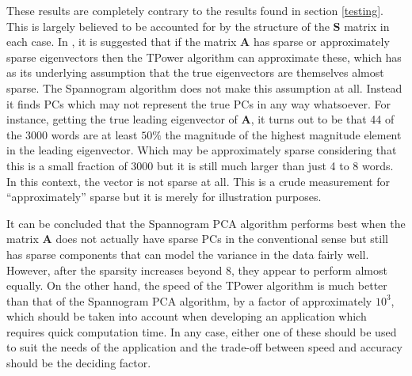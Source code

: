 \documentclass[11pt,a4paper]{article}
\begin{document}
These results are completely contrary to the results found in section \ref{testing}. This is largely believed to be accounted for by the structure of the $\mathbf{S}$ matrix in each case. In \cite{truncpower}, it is suggested that if the matrix $\mathbf{A}$ has sparse or approximately sparse eigenvectors then the TPower algorithm can approximate these, which has as its underlying assumption that the true eigenvectors are themselves almost sparse. The Spannogram algorithm does not make this assumption at all. Instead it finds PCs which may not represent the true PCs in any way whatsoever. For instance, getting the true leading eigenvector of $\mathbf{A}$, it turns out to be that 44 of the 3000 words are at least $50\%$ the magnitude of the highest magnitude element in the leading eigenvector. Which may be approximately sparse considering that this is a small fraction of 3000 but it is still much larger than just 4 to 8 words. In this context, the vector is not sparse at all. This is a crude measurement for ``approximately'' sparse but it is merely for illustration purposes. 

It can be concluded that the Spannogram PCA algorithm performs best when the matrix $\mathbf{A}$ does not actually have sparse PCs in the conventional sense but still has sparse components that can model the variance in the data fairly well. However, after the sparsity increases beyond 8, they appear to perform almost equally. On the other hand, the speed of the TPower algorithm is much better than that of the Spannogram PCA algorithm, by a factor of approximately $10^3$, which should be taken into account when developing an application which requires quick computation time. In any case, either one of these should be used to suit the needs of the application and the trade-off between speed and accuracy should be the deciding factor. 
\clearpage
\end{document}
